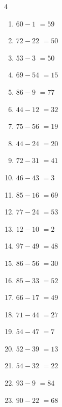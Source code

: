 \begin{multicols}{4}
\begin{enumerate}
  \item $60-1$
        $=59$

  \item $72-22$
        $=50$

  \item $53-3$
        $=50$

  \item $69-54$
        $=15$

  \item $86-9$
        $=77$

  \item $44-12$
        $=32$

  \item $75-56$
        $=19$

  \item $44-24$
        $=20$

  \item $72-31$
        $=41$

  \item $46-43$
        $=3$

  \item $85-16$
        $=69$

  \item $77-24$
        $=53$

  \item $12-10$
        $=2$

\columnbreak %

  \item $97-49$
        $=48$

  \item $86-56$
        $=30$

  \item $85-33$
        $=52$

  \item $66-17$
        $=49$

  \item $71-44$
        $=27$

  \item $54-47$
        $=7$

  \item $52-39$
        $=13$

  \item $54-32$
        $=22$

  \item $93-9$
        $=84$

  \item $90-22$
        $=68$


\end{enumerate}
\end{multicols}
